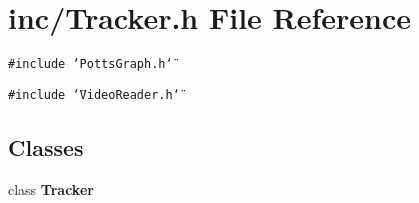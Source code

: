 \section{inc/Tracker.h File Reference}
\label{Tracker_8h}
{\tt \#include \char`\"{}PottsGraph.h\char`\"{}}\par
{\tt \#include \char`\"{}VideoReader.h\char`\"{}}\par
\subsection*{Classes}
\begin{CompactItemize}
\item 
class {\bf Tracker}
\end{CompactItemize}
